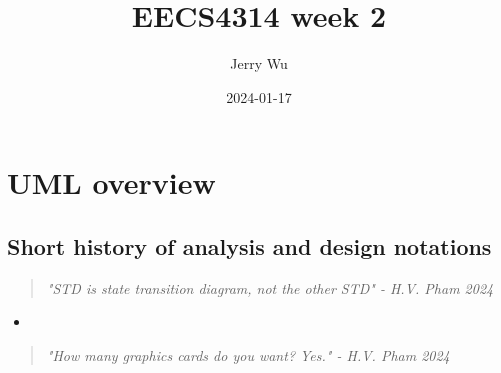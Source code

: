 \documentclass[12pt]{book}
\title{EECS4314 week 2}
\author{Jerry Wu}
\date{2024-01-17}
\begin{document}
\maketitle
\tableofcontents

\chapter{UML overview}

\section*{Short history of analysis and design notations}

\begin{quote}
    \textit{"STD is state transition diagram, not the other STD" - H.V. Pham 2024}
\end{quote}

\begin{itemize}
    \item 
\end{itemize}

\begin{quote}
    \textit{"How many graphics cards do you want? Yes." - H.V. Pham 2024}
\end{quote}
\end{document}
